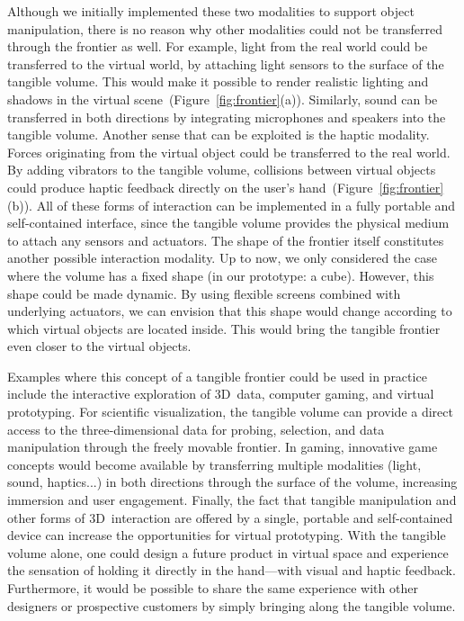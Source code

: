 \documentclass{vgtc}                         \havecopyrightspacefalse
\begin{document}
Although we initially implemented these two modalities to support object manipulation, there is no reason why other modalities could not be transferred through the frontier as well. For example, light from the real world could be transferred to the virtual world, by attaching light sensors to the surface of the tangible volume. This would make it possible to render realistic lighting and shadows in the virtual scene~(Figure~\ref{fig:frontier}(a)). Similarly, sound can be transferred in both directions by integrating microphones and speakers into the tangible volume. Another sense that can be exploited is the haptic modality. Forces originating from the virtual object could be transferred to the real world. By adding vibrators to the tangible volume, collisions between virtual objects could produce haptic feedback directly on the user's hand~(Figure~\ref{fig:frontier}(b)). All of these forms of interaction can be implemented in a fully portable and self-contained interface, since the tangible volume provides the physical medium to attach any sensors and actuators. The shape of the frontier itself constitutes another possible interaction modality. Up to now, we only considered the case where the volume has a fixed shape (in our prototype: a cube). However, this shape could be made dynamic. By using flexible screens combined with underlying actuators, we can envision that this shape would change according to which virtual objects are located inside. This would bring the tangible frontier even closer to the virtual objects.

Examples where this concept of a tangible frontier could be used in practice include the interactive exploration of 3D~data, computer gaming, and virtual prototyping. For scientific visualization, the tangible volume can provide a direct access to the three-dimensional data for probing, selection, and data manipulation through the freely movable frontier. In gaming, innovative game concepts would become available by transferring multiple modalities (light, sound, haptics...) in both directions through the surface of the volume, increasing immersion and user engagement. Finally, the fact that tangible manipulation and other forms of 3D~interaction are offered by a single, portable and self-contained device can increase the opportunities for virtual prototyping. With the tangible volume alone, one could design a future product in virtual space and experience the sensation of holding it directly in the hand---with visual and haptic feedback. Furthermore, it would be possible to share the same experience with other designers or prospective customers by simply bringing along the tangible volume.
\end{document}
